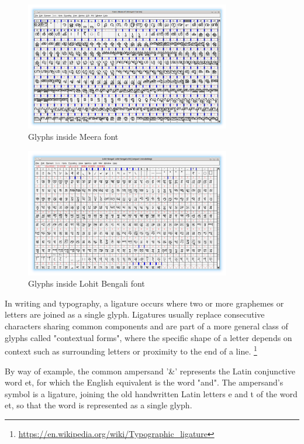 \begin{figure}[h]
    \centering
    \includegraphics[width=0.8\textwidth]{glyph-fontforge-meera.png}
    \caption{Glyphs inside Meera font}
\end{figure}

\begin{figure}[h]
    \centering
    \includegraphics[width=0.8\textwidth]{glyph-fontforge-lohit-bengali.png}
    \caption{Glyphs inside Lohit Bengali font}
\end{figure}


In writing and typography, a ligature occurs where two or more graphemes or letters are joined as a single glyph. Ligatures usually replace consecutive characters sharing common components and are part of a more general class of glyphs called "contextual forms", where the specific shape of a letter depends on context such as surrounding letters or proximity to the end of a line.
\footnote{\url{https://en.wikipedia.org/wiki/Typographic_ligature}}

By way of example, the common ampersand '\&' represents the Latin conjunctive word et, for which the English equivalent is the word "and". The ampersand's symbol is a ligature, joining the old handwritten Latin letters e and t of the word et, so that the word is represented as a single glyph.


